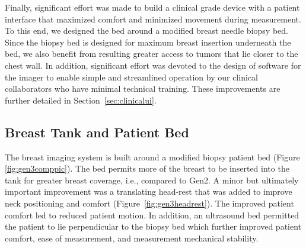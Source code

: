 Finally, significant effort was made to build a clinical grade device with a patient interface that maximized comfort and minimized movement during measurement. To this end, we designed the bed around a modified breast needle biopsy bed. Since the biopsy bed is designed for maximum breast insertion underneath the bed, we also benefit from resulting greater access to tumors that lie closer to the chest wall. In addition, significant effort was devoted to the design of software for the imager to enable simple and streamlined operation by our clinical collaborators who have minimal technical training. These improvements are further detailed in Section~\ref{sec:clinicalui}.

\subsection{Breast Tank and Patient Bed}
The breast imaging system is built around a modified biopsy patient bed (Figure \ref{fig:gen3comppic}). The bed permits more of the breast to be inserted into the tank for greater breast coverage, i.e., compared to Gen2. A minor but ultimately important improvement was a translating head-rest that was added to improve neck positioning and comfort (Figure~\ref{fig:gen3headrest}). The improved patient comfort led to reduced patient motion. In addition, an ultrasound bed permitted the patient to lie perpendicular to the biopsy bed which further improved patient comfort, ease of measurement, and measurement mechanical stability.

